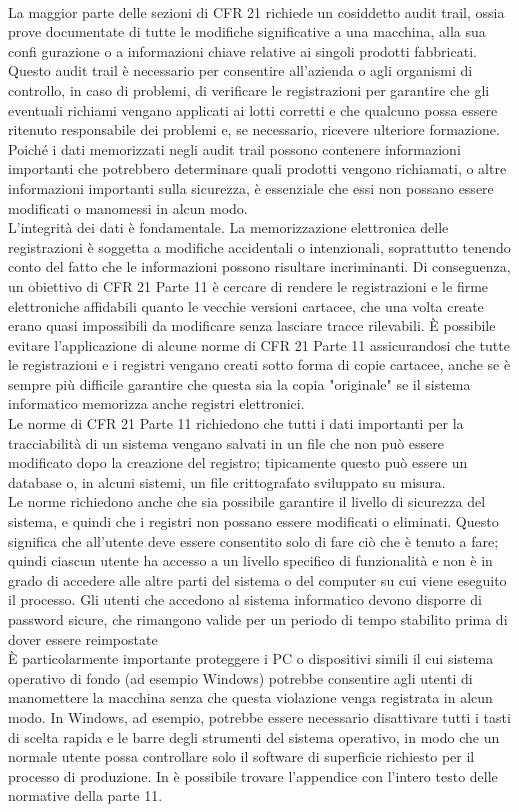 \documentclass[12pt, a4paper, oneside]{book}
\begin{document}
\\La maggior parte delle sezioni di CFR 21 richiede un cosiddetto audit trail, ossia prove documentate di tutte le modifiche significative a una macchina, alla sua confi gurazione o a informazioni chiave relative ai singoli prodotti fabbricati. Questo audit trail è necessario per consentire all'azienda o agli organismi di controllo, in caso di problemi, di verificare le registrazioni per garantire che gli eventuali richiami vengano applicati ai lotti corretti e che qualcuno possa essere ritenuto responsabile dei problemi e, se necessario, ricevere ulteriore formazione. Poiché i dati memorizzati negli audit trail possono contenere informazioni importanti che potrebbero determinare quali prodotti vengono richiamati, o altre informazioni importanti sulla sicurezza, è essenziale che essi non possano essere modificati o manomessi in alcun modo. \\L'integrità dei dati è fondamentale. La memorizzazione elettronica delle registrazioni è soggetta a modifiche accidentali o intenzionali, soprattutto tenendo conto del fatto che le informazioni possono risultare incriminanti. Di conseguenza, un obiettivo di CFR 21 Parte 11 è cercare di rendere le registrazioni e le firme elettroniche affidabili quanto le vecchie versioni cartacee, che una volta create erano quasi impossibili da modificare senza lasciare tracce rilevabili. È possibile evitare l'applicazione di alcune norme di CFR 21 Parte 11 assicurandosi che tutte le registrazioni e i registri vengano creati sotto forma di copie cartacee, anche se è sempre più difficile garantire che questa sia la copia "originale" se il sistema informatico memorizza anche registri elettronici. \\Le norme di CFR 21 Parte 11 richiedono che tutti i dati importanti per la tracciabilità di un sistema vengano salvati in un file che non può essere modificato dopo la creazione del registro; tipicamente questo può essere un database o, in alcuni sistemi, un file crittografato sviluppato su misura. \\Le norme richiedono anche che sia possibile garantire il livello di sicurezza del sistema, e quindi che i registri non possano essere modificati o eliminati. Questo significa che all'utente deve essere consentito solo di fare ciò che è tenuto a fare; quindi ciascun utente ha accesso a un livello specifico di funzionalità e non è in grado di accedere alle altre parti del sistema o del computer su cui viene eseguito il processo. Gli utenti che accedono al sistema informatico devono disporre
di password sicure, che rimangono valide per un periodo di tempo stabilito prima di dover essere reimpostate \\
È particolarmente importante proteggere i PC o dispositivi simili il cui sistema operativo di fondo (ad esempio Windows) potrebbe consentire agli utenti di manomettere la macchina senza che questa violazione venga registrata in alcun modo. In Windows, ad esempio, potrebbe essere necessario disattivare tutti i tasti di scelta rapida e le barre degli strumenti del sistema operativo, in modo che un normale utente possa controllare solo il software di superficie richiesto per il processo di produzione. In \cite{CFR} è possibile trovare l'appendice con l'intero testo delle normative della parte 11.
\end{document}
